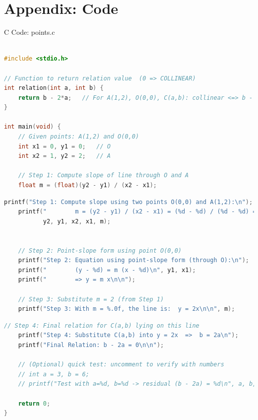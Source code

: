 \documentclass{beamer}
\begin{document}
\section*{Appendix: Code}

\begin{frame}[fragile]{C Code: points.c }
\begin{lstlisting}[language=C]

#include <stdio.h>

// Function to return relation value  (0 => COLLINEAR)
int relation(int a, int b) {
    return b - 2*a;   // For A(1,2), O(0,0), C(a,b): collinear <=> b - 2a = 0
}

int main(void) {
    // Given points: A(1,2) and O(0,0)
    int x1 = 0, y1 = 0;   // O
    int x2 = 1, y2 = 2;   // A

    // Step 1: Compute slope of line through O and A
    float m = (float)(y2 - y1) / (x2 - x1);
    \end{lstlisting}
\end{frame}

\begin{frame}[fragile]
\begin{lstlisting}[language=C]
    printf("Step 1: Compute slope using two points O(0,0) and A(1,2):\n");
    printf("        m = (y2 - y1) / (x2 - x1) = (%d - %d) / (%d - %d) = %.2f\n\n",
           y2, y1, x2, x1, m);


    // Step 2: Point-slope form using point O(0,0)
    printf("Step 2: Equation using point-slope form (through O):\n");
    printf("        (y - %d) = m (x - %d)\n", y1, x1);
    printf("        => y = m x\n\n");

    // Step 3: Substitute m = 2 (from Step 1)
    printf("Step 3: With m = %.0f, the line is:  y = 2x\n\n", m);
\end{lstlisting}
\end{frame}

\begin{frame}[fragile]
\begin{lstlisting}[language=C]
    // Step 4: Final relation for C(a,b) lying on this line
    printf("Step 4: Substitute C(a,b) into y = 2x  =>  b = 2a\n");
    printf("Final Relation: b - 2a = 0\n\n");

    // (Optional) quick test: uncomment to verify with numbers
    // int a = 3, b = 6;
    // printf("Test with a=%d, b=%d -> residual (b - 2a) = %d\n", a, b, relation(a,b));

    return 0;
}

  
\end{lstlisting}
\end{frame}
\end{document}
